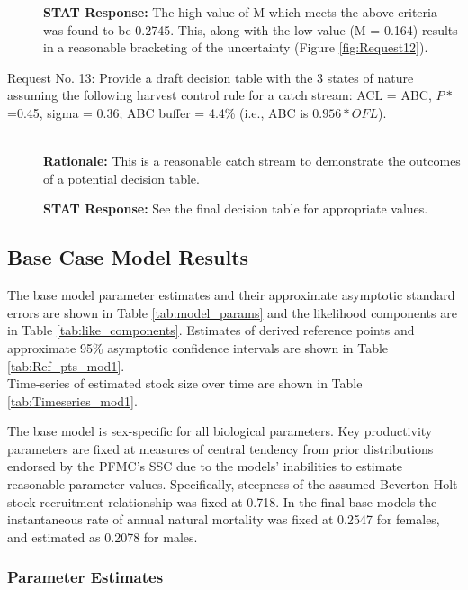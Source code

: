 \documentclass[12pt,]{article}
\begin{document}
\begin{description}
  
\textbf{STAT Response:} The high value of M which meets the above criteria was found to be 
    0.2745. This, along with the low value (M = 0.164) results in a reasonable bracketing of 
    the uncertainty (Figure \ref{fig:Request12}). 

\item[Request No. 13: Provide a draft decision table with the 3 states of nature assuming the 
following harvest control rule for a catch stream:  ACL = ABC, $P*$=0.45, sigma = 0.36; 
ABC buffer = 4.4\% (i.e., ABC is $0.956*OFL$).] \hfill \\

\textbf{Rationale:} This is a reasonable catch stream to demonstrate the outcomes of a 
    potential decision table.
  
\textbf{STAT Response:} See the final decision table for appropriate values.

\end{description}

\subsection{Base Case Model Results}\label{base-case-model-results}

The base model parameter estimates and their approximate asymptotic
standard errors are shown in Table \ref{tab:model_params} and the
likelihood components are in Table \ref{tab:like_components}. Estimates
of derived reference points and approximate 95\% asymptotic confidence
intervals are shown in Table \ref{tab:Ref_pts_mod1}.\\
Time-series of estimated stock size over time are shown in Table
\ref{tab:Timeseries_mod1}.

The base model is sex-specific for all biological parameters. Key
productivity parameters are fixed at measures of central tendency from
prior distributions endorsed by the PFMC's SSC due to the models'
inabilities to estimate reasonable parameter values. Specifically,
steepness of the assumed Beverton-Holt stock-recruitment relationship
was fixed at 0.718. In the final base models the instantaneous rate of
annual natural mortality was fixed at 0.2547 for females, and estimated
as 0.2078 for males.

\subsubsection{Parameter Estimates}\label{parameter-estimates}
\end{document}
